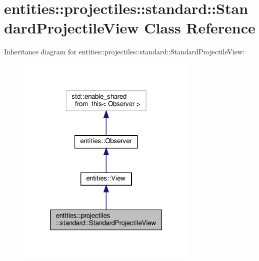 \hypertarget{classentities_1_1projectiles_1_1standard_1_1StandardProjectileView}{}\section{entities\+:\+:projectiles\+:\+:standard\+:\+:Standard\+Projectile\+View Class Reference}
\label{classentities_1_1projectiles_1_1standard_1_1StandardProjectileView}


Inheritance diagram for entities\+:\+:projectiles\+:\+:standard\+:\+:Standard\+Projectile\+View\+:\nopagebreak
\begin{figure}[H]
\begin{center}
\leavevmode
\includegraphics[width=247pt]{classentities_1_1projectiles_1_1standard_1_1StandardProjectileView__inherit__graph}
\end{center}
\end{figure}


